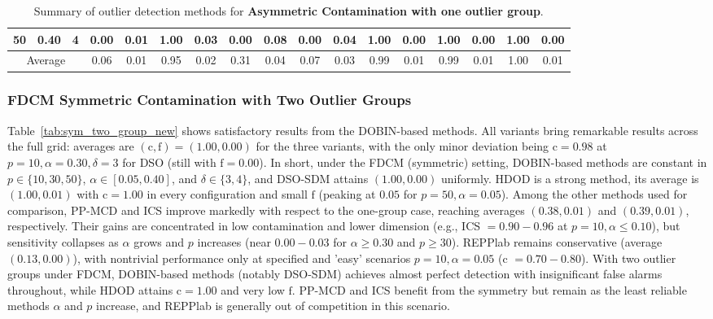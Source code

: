 \documentclass[12pt]{article}
\begin{document}
\begin{table}[H]
{\begin{tabular}{|*{17}{c|}|}
50 & 0.40 & 4 & 0.00 & 0.01 & 1.00 & 0.03 & 0.00 & 0.08 & 0.00 & 0.04 & 1.00 & 0.00 & 1.00 & 0.00 & 1.00 & 0.00 \\ \hline
\multicolumn{3}{|c|}{Average} & 0.06 & 0.01 & 0.95 & 0.02 & 0.31 & 0.04 & 0.07 & 0.03 & 0.99 & 0.01 & 0.99 & 0.01 & 1.00 & 0.01 \\ \hline
\end{tabular}}
\endgroup
\caption{Summary of outlier detection methods for \textbf{Asymmetric Contamination with one outlier group}.}
\label{tab:asym_one_group}
\end{table}


\subsubsection*{FDCM Symmetric Contamination with Two Outlier Groups}



Table~\ref{tab:sym_two_group_new} shows satisfactory results from the DOBIN-based methods. All variants bring remarkable results across the full grid: averages are \((\text{c},\text{f})=(1.00,0.00)\) for the three variants, with the only minor deviation being \(\text{c}=0.98\) at \(p=10,\alpha=0.30,\delta=3\) for DSO (still with \(\text{f}=0.00\)). In short, under the FDCM (symmetric) setting, DOBIN-based methods are constant in \(p \in \{10,30,50\}\), \(\alpha \in [0.05,0.40]\), and \(\delta \in \{3,4\}\), and DSO-SDM attains \((1.00,0.00)\) uniformly. 
HDOD is a strong method, its average is \((1.00,0.01)\) with \(\text{c}=1.00\) in every configuration and small \(\text{f}\) (peaking at \(0.05\) for \(p=50,\alpha=0.05\)). 
Among the other methods used for comparison, PP-MCD and ICS improve markedly with respect to the one-group case, reaching averages \((0.38,0.01)\) and \((0.39,0.01)\), respectively. 
Their gains are concentrated in low contamination and lower dimension (e.g., ICS \(=0.90{-}0.96\) at \(p=10,\alpha\leq0.10\)), but sensitivity collapses as \(\alpha\) grows and \(p\) increases (near \(0.00{-}0.03\) for \(\alpha\geq0.30\) and \(p\geq30\)). REPPlab remains conservative (average \((0.13,0.00)\)), with nontrivial performance only at specified and 'easy' scenarios \(p=10,\alpha=0.05\) (c \(=0.70{-}0.80\)). With two outlier groups under FDCM, DOBIN-based methods (notably DSO-SDM) achieves almost perfect detection with insignificant false alarms throughout, while HDOD attains \(\text{c}=1.00\) and very low \(\text{f}\). PP-MCD and ICS benefit from the symmetry but remain as the least reliable methods \(\alpha\) and \(p\) increase, and REPPlab is generally out of competition in this scenario.
\end{document}

